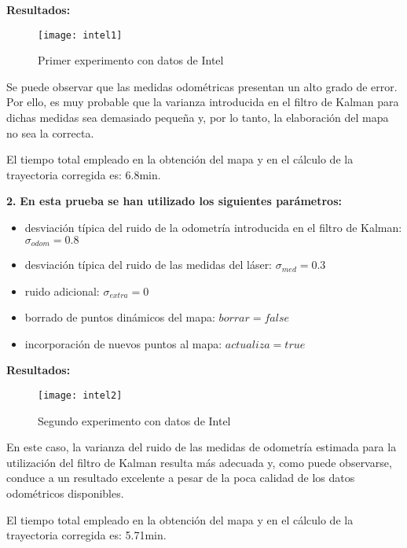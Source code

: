 \textbf{Resultados:}


\begin{figure}[h]
  \centering\texttt{[image: intel1]}\\
  \caption{Primer experimento con datos de Intel}\label{fg:intel1}
\end{figure}

Se puede observar que las medidas odométricas presentan un alto grado de error. Por ello, es muy probable que la varianza introducida en el filtro de Kalman para dichas medidas sea demasiado pequeña y, por lo tanto, la elaboración del mapa no sea la correcta.

El tiempo total empleado en la obtención del mapa y en el cálculo de la trayectoria corregida es: 6.8min.

\vspace{5cm}
\noindent
\textbf{2.} \textbf{En esta prueba se han utilizado los siguientes parámetros:}
\begin{itemize}
  \item desviación típica del ruido de la odometría introducida en el filtro de Kalman: $\sigma_{odom} = 0.8$
  \item desviación típica del ruido de las medidas del láser: $\sigma_{med} = 0.3$
  \item ruido adicional: $\sigma_{extra} = 0$
  \item borrado de puntos dinámicos del mapa: $borrar = false$
  \item incorporación de nuevos puntos al mapa: $actualiza = true$
\end{itemize}


\textbf{Resultados:}

\begin{figure}[h]
  \centering\texttt{[image: intel2]}\\
  \caption{Segundo experimento con datos de Intel}\label{fg:intel2}
\end{figure}

En este caso, la varianza del ruido de las medidas de odometría estimada para la utilización del filtro de Kalman resulta más adecuada y, como puede observarse, conduce a un resultado excelente a pesar de la poca calidad de los datos odométricos disponibles.

El tiempo total empleado en la obtención del mapa y en el cálculo de la trayectoria corregida es: 5.71min.

